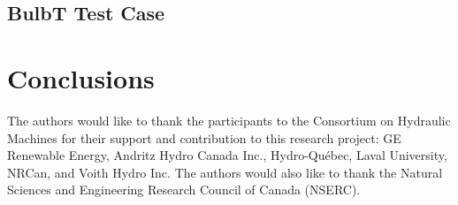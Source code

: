 \documentclass[twocolumn,10pt]{asme2ej}
\begin{document}
\subsection{BulbT Test Case}


\section{Conclusions}


\begin{acknowledgment}
The authors would like to thank the participants to the Consortium on Hydraulic Machines for their support and contribution to this research project: GE Renewable Energy, Andritz Hydro Canada Inc., Hydro-Qu\'ebec, Laval University, NRCan, and Voith Hydro Inc. The authors would also like to thank the Natural Sciences and Engineering Research Council of Canada (NSERC).
\end{acknowledgment}
\FloatBarrier
%




%
\end{document}
